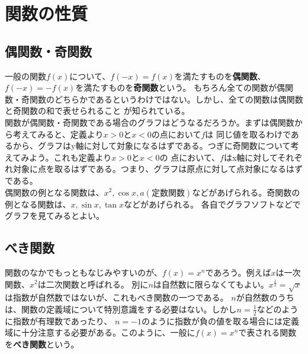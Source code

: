 \documentclass[a4j,dvipdfmx]{jsarticle}
\begin{document}
        \section{関数の性質}
            \subsection{偶関数・奇関数}
                一般の関数$f(x)$について、$f(-x)=f(x)$を満たすものを\textbf{偶関数}、$f(-x)=-f(x)$を満たすものを\textbf{奇関数}という。
                もちろん全ての関数が偶関数・奇関数のどちらかであるというわけではない。しかし、全ての関数は偶関数と奇関数の和で表せられること
                が知られている。\\

                関数が偶関数・奇関数である場合のグラフはどうなるだろうか。まずは偶関数から考えてみると、定義より$x>0$と$x<0$の点において$f$は
                同じ値を取るわけであるから、グラフはy軸に対して対象になるはずである。つぎに奇関数について考えてみよう。これも定義より$x>0$と$x<0$の
                点において、$f$はx軸に対してそれぞれ対象に点を取るはずである。つまり、グラフは原点に対して点対象になるはずである。\\

                偶関数の例となる関数は、$x^2,\cos x,a(\text{定数関数})$などがあげられる。奇関数の例となる関数は、$x,\sin x,\tan x$などがあげられる。
                各自でグラフソフトなどでグラフを見てみるとよい。
            \clearpage
            \subsection{べき関数}
                関数のなかでもっともなじみやすいのが、$f(x)=x^n$であろう。例えば$x$は一次関数、$x^2$は二次関数と呼ばれる。
                別に$n$は自然数に限らなくてもよい。$x^{\frac{1}{2}}=\sqrt{x}$は指数が自然数ではないが、これもべき関数の一つである。
                $n$が自然数のうちは、関数の定義域について特別意識をする必要はない。しかし$n=\frac{1}{2}$などのように指数が有理数であったり、
                $n=-1$のように指数が負の値を取る場合には定義域に十分注意する必要がある。このように、一般に$f(x)=x^n$で表される関数を\textbf{べき関数}という。
\end{document}
